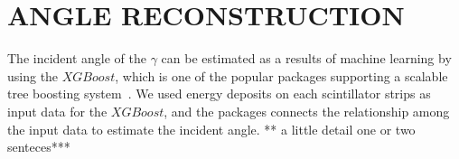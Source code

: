 \documentclass[jkps,preprint,fleqn,showpacs,showkeys]{revtex4}
\newcommand{\XGB}{XGBoost}
\begin{document}

\section{ANGLE RECONSTRUCTION}
\label{sec:res}

The incident angle of the $\gamma$ can be estimated as a results of machine learning by using the $\XGB$, which is one of the popular packages supporting a scalable tree boosting system~\cite{xgboost:2016}. We used energy deposits on each scintillator strips as input data for the $\XGB$, and the packages connects the relationship among the input data to estimate the incident angle. ** a little detail one or two senteces***

\end{document}

